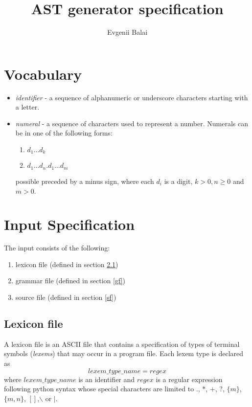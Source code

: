 \documentclass[a4paper,10pt]{article}
\title{AST generator specification}
\author{Evgenii Balai}
\def\st{\noindent}
\begin{document}
\maketitle
\st

\tableofcontents
\section{Vocabulary}

\begin{itemize}
\item \textit{identifier} -  a sequence of alphanumeric or underscore characters starting with a letter.
\item \textit{numeral} - a sequence of characters used to represent a number. Numerals can be in one of the following forms:
\begin{enumerate}
\item $d_1\ldots d_k$
\item $d_1\ldots d_n.d_1\ldots d_m$
\end{enumerate}
possible preceded by a minus sign,
where each $d_i$ is a digit, $k > 0, n\ge 0$ and $m >0$.
\end{itemize}


\section{Input Specification}
The input consists of the following:
\begin{enumerate}
\item lexicon file (defined in section \ref{lf})
\item grammar file (defined in section \ref{gf}) 
\item source file (defined in section \ref{sf})
\end{enumerate}

\subsection{Lexicon file}\label{lf}

A lexicon file is an ASCII file that contains a specification of types of terminal symbols (\textit{lexems}) that may occur in a program file.
Each lexem type is declared as 
\begin{equation}\label{lexdef}
lexem\_type\_name = regex
\end{equation}
where $lexem\_type\_name$ is an identifier and $regex$ is a regular expression following python syntax\cite{pythonre} whose special characters are limited to $.$, $*$, $+$, $?$, $\{m\}$, $\{m,n\}$, $[]$,$\backslash$ or $|$.
\end{document}
